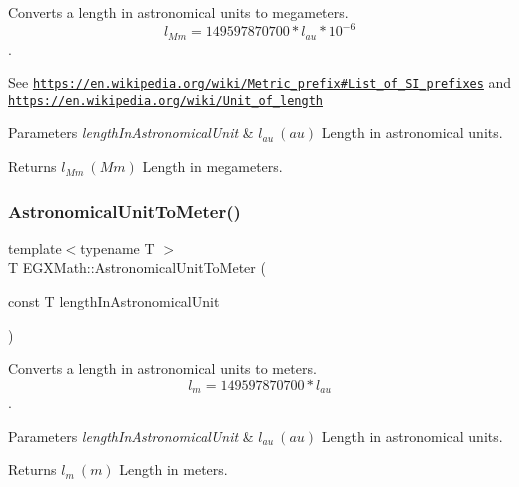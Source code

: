 Converts a length in astronomical units to megameters. \[ l_{Mm}=149597870700 * l_{au} * 10^{-6} \]. 

See \href{https://en.wikipedia.org/wiki/Metric_prefix#List_of_SI_prefixes}{\tt https\+://en.\+wikipedia.\+org/wiki/\+Metric\+\_\+prefix\#\+List\+\_\+of\+\_\+\+S\+I\+\_\+prefixes} and \href{https://en.wikipedia.org/wiki/Unit_of_length}{\tt https\+://en.\+wikipedia.\+org/wiki/\+Unit\+\_\+of\+\_\+length} 
\begin{DoxyParams}{Parameters}
{\em length\+In\+Astronomical\+Unit} & $ l_{au}\ (au)$ Length in astronomical units. \\
\hline
\end{DoxyParams}
\begin{DoxyReturn}{Returns}
$ l_{Mm}\ (Mm)$ Length in megameters. 
\end{DoxyReturn}
\mbox{\label{group___e_g_x_math-_conversions-_length_conversions-_astronomical-_astronomical_unit-_s_i_gafa85cf1b3dc583681c13501fa9d923ff}} 
\subsubsection{\texorpdfstring{Astronomical\+Unit\+To\+Meter()}{AstronomicalUnitToMeter()}}
{\footnotesize\ttfamily template$<$typename T $>$ \\
T E\+G\+X\+Math\+::\+Astronomical\+Unit\+To\+Meter (\begin{DoxyParamCaption}\item[{const T}]{length\+In\+Astronomical\+Unit }\end{DoxyParamCaption})}



Converts a length in astronomical units to meters. \[ l_{m}=149597870700 * l_{au} \]. 


\begin{DoxyParams}{Parameters}
{\em length\+In\+Astronomical\+Unit} & $ l_{au}\ (au)$ Length in astronomical units. \\
\hline
\end{DoxyParams}
\begin{DoxyReturn}{Returns}
$ l_{m}\ (m)$ Length in meters. 
\end{DoxyReturn}
\mbox{\label{group___e_g_x_math-_conversions-_length_conversions-_astronomical-_astronomical_unit-_s_i_ga23b887b2e141dc9686237c124e2245ac}} 
